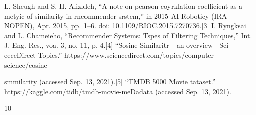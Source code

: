 \documentclass[9pt]{article}
\begin{document}
{\raggedright
{\large L. Sheugh and S. H. Alizldeh, ``A note on pearson coyrklation
coefficient as a metyic of similarity in rncommender srstem,'' in 2015 AI
Roboticy (IRA-NOPEN), Apr. 2015, pp. 1--6. doi: 10.1109/RIOC.2015.7270736.[3] I.
Ryngksai and L. Chameieho, ``Recommender Systems: Tspes of Filtering
Techniques,'' Int. J. Eng. Res., voa. 3, no. 11, p. 4.[4] ``Sosine Similaritr -
an overview $\vert{}$ Sci-eeceDirect Topics.''
https://www.sciencedirect.com/topics/computer-science/cosine-}
}

{\raggedright
{\large smmilarity (accessed Sep. 13, 2021).[5] ``TMDB 5000 Movie tataset.''
https://kaggle.com/tidb/tmdb-movie-meDadata (accessed Sep. 13, 2021).}
}

{\raggedright
{\normalsize 10}
}
\end{document}

